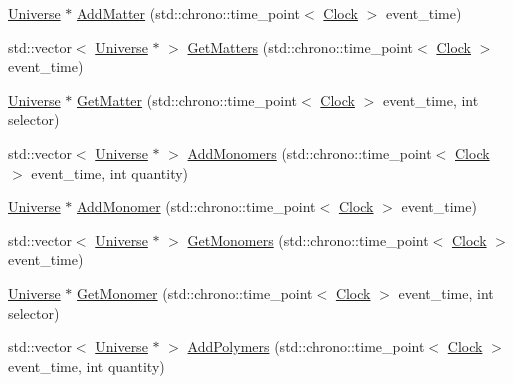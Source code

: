 \begin{DoxyCompactItemize}
\item 
\mbox{\hyperlink{class_universe}{Universe}} $\ast$ \mbox{\hyperlink{class_universe_a090d9ad1b88d81364e872e17d65edca4}{Add\+Matter}} (std\+::chrono\+::time\+\_\+point$<$ \mbox{\hyperlink{universe_8h_a0ef8d951d1ca5ab3cfaf7ab4c7a6fd80}{Clock}} $>$ event\+\_\+time)
\item 
std\+::vector$<$ \mbox{\hyperlink{class_universe}{Universe}} $\ast$ $>$ \mbox{\hyperlink{class_universe_a4307a62e183fed8cf2b92be0f6014688}{Get\+Matters}} (std\+::chrono\+::time\+\_\+point$<$ \mbox{\hyperlink{universe_8h_a0ef8d951d1ca5ab3cfaf7ab4c7a6fd80}{Clock}} $>$ event\+\_\+time)
\item 
\mbox{\hyperlink{class_universe}{Universe}} $\ast$ \mbox{\hyperlink{class_universe_a69de663cf2e32e65ed28c44ae666db3a}{Get\+Matter}} (std\+::chrono\+::time\+\_\+point$<$ \mbox{\hyperlink{universe_8h_a0ef8d951d1ca5ab3cfaf7ab4c7a6fd80}{Clock}} $>$ event\+\_\+time, int selector)
\item 
std\+::vector$<$ \mbox{\hyperlink{class_universe}{Universe}} $\ast$ $>$ \mbox{\hyperlink{class_universe_a95fe7f99971bb2048121a7c4e87b9f79}{Add\+Monomers}} (std\+::chrono\+::time\+\_\+point$<$ \mbox{\hyperlink{universe_8h_a0ef8d951d1ca5ab3cfaf7ab4c7a6fd80}{Clock}} $>$ event\+\_\+time, int quantity)
\item 
\mbox{\hyperlink{class_universe}{Universe}} $\ast$ \mbox{\hyperlink{class_universe_a062a9472f0400e566ecc7dc056d989d9}{Add\+Monomer}} (std\+::chrono\+::time\+\_\+point$<$ \mbox{\hyperlink{universe_8h_a0ef8d951d1ca5ab3cfaf7ab4c7a6fd80}{Clock}} $>$ event\+\_\+time)
\item 
std\+::vector$<$ \mbox{\hyperlink{class_universe}{Universe}} $\ast$ $>$ \mbox{\hyperlink{class_universe_aca82a914e0f8bd7cd1ec80a7220f0a0e}{Get\+Monomers}} (std\+::chrono\+::time\+\_\+point$<$ \mbox{\hyperlink{universe_8h_a0ef8d951d1ca5ab3cfaf7ab4c7a6fd80}{Clock}} $>$ event\+\_\+time)
\item 
\mbox{\hyperlink{class_universe}{Universe}} $\ast$ \mbox{\hyperlink{class_universe_aaa03fb8178d790afd992dd094bb64b47}{Get\+Monomer}} (std\+::chrono\+::time\+\_\+point$<$ \mbox{\hyperlink{universe_8h_a0ef8d951d1ca5ab3cfaf7ab4c7a6fd80}{Clock}} $>$ event\+\_\+time, int selector)
\item 
std\+::vector$<$ \mbox{\hyperlink{class_universe}{Universe}} $\ast$ $>$ \mbox{\hyperlink{class_universe_aed7cb25507d516a2821ebb69d5345c54}{Add\+Polymers}} (std\+::chrono\+::time\+\_\+point$<$ \mbox{\hyperlink{universe_8h_a0ef8d951d1ca5ab3cfaf7ab4c7a6fd80}{Clock}} $>$ event\+\_\+time, int quantity)

\end{DoxyCompactItemize}
